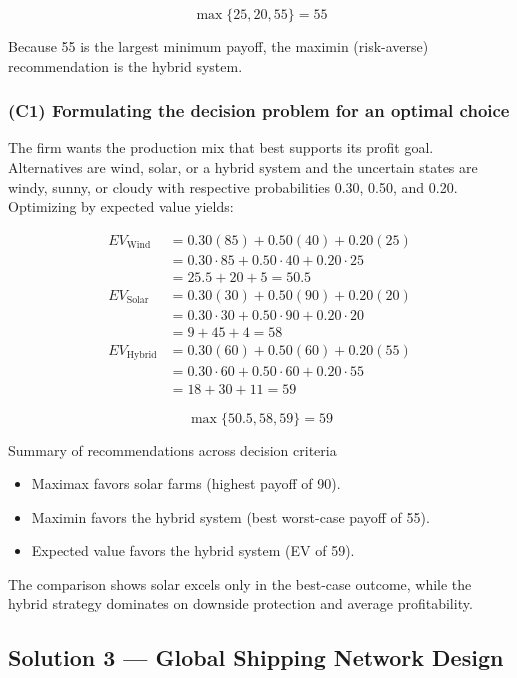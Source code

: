 \[
\max\{25, 20, 55\} = 55
\]

Because 55 is the largest minimum payoff, the maximin (risk-averse) recommendation is the hybrid system.

\subsubsection{(C1) Formulating the decision problem for an optimal choice}\label{subsubsec:practice-activity-1-solution-2-c1}

The firm wants the production mix that best supports its profit goal. Alternatives are wind,
solar, or a hybrid system and the uncertain states are windy,
sunny, or cloudy with respective probabilities 0.30, 0.50, and 0.20. Optimizing
by expected value yields:

\[
\begin{aligned}
EV_{\text{Wind}} &= 0.30(85) + 0.50(40) + 0.20(25) \\
&= 0.30\cdot85 + 0.50\cdot40 + 0.20\cdot25 \\
&= 25.5 + 20 + 5 = 50.5 \\
EV_{\text{Solar}} &= 0.30(30) + 0.50(90) + 0.20(20) \\
&= 0.30\cdot30 + 0.50\cdot90 + 0.20\cdot20 \\
&= 9 + 45 + 4 = 58 \\
EV_{\text{Hybrid}} &= 0.30(60) + 0.50(60) + 0.20(55) \\
&= 0.30\cdot60 + 0.50\cdot60 + 0.20\cdot55 \\
&= 18 + 30 + 11 = 59
\end{aligned}
\]

\[
\max\{50.5, 58, 59\} = 59
\]

Summary of recommendations across decision criteria

\begin{itemize}
	\item Maximax favors solar farms (highest payoff of 90).
	\item Maximin favors the hybrid system (best worst-case payoff of 55).
	\item Expected value favors the hybrid system (EV of 59).
\end{itemize}

The comparison shows solar excels only in the best-case outcome, while the hybrid strategy dominates on downside
protection and average profitability.

\subsection{Solution 3 --- Global Shipping Network Design}\label{subsec:practice-activity-1-solution-3}

